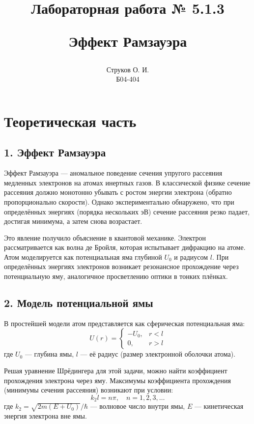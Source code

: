 \documentclass[12pt,a4paper]{article}
\begin{document}
\title{\begin{center}Лабораторная работа № 5.1.3\end{center}
Эффект Рамзауэра}
\author{Струков О. И. \\ Б04-404}
\date{}

\thispagestyle{empty}
\maketitle
\newpage
{}


\section*{Теоретическая часть}

\subsection*{1. Эффект Рамзауэра}
Эффект Рамзауэра --- аномальное поведение сечения упругого рассеяния медленных электронов на атомах инертных газов. В классической физике сечение рассеяния должно монотонно убывать с ростом энергии электрона (обратно пропорционально скорости). Однако экспериментально обнаружено, что при определённых энергиях (порядка нескольких эВ) сечение рассеяния резко падает, достигая минимума, а затем снова возрастает.

Это явление получило объяснение в квантовой механике. Электрон рассматривается как волна де Бройля, которая испытывает дифракцию на атоме. Атом моделируется как потенциальная яма глубиной $U_0$ и радиусом $l$. При определённых энергиях электронов возникает резонансное прохождение через потенциальную яму, аналогичное просветлению оптики в тонких плёнках.

\subsection*{2. Модель потенциальной ямы}
В простейшей модели атом представляется как сферическая потенциальная яма:
\begin{equation}
    U(r) = \begin{cases}
        -U_0, & r < l \\
        0, & r > l
    \end{cases}
\end{equation}
где $U_0$ --- глубина ямы, $l$ --- её радиус (размер электронной оболочки атома).

Решая уравнение Шрёдингера для этой задачи, можно найти коэффициент прохождения электрона через яму. Максимумы коэффициента прохождения (минимумы сечения рассеяния) возникают при условии:
\begin{equation}
    k_2 l = n\pi, \quad n = 1, 2, 3, \ldots
\end{equation}
где $k_2 = \sqrt{2m(E + U_0)}/\hbar$ --- волновое число внутри ямы, $E$ --- кинетическая энергия электрона вне ямы.
\end{document}
